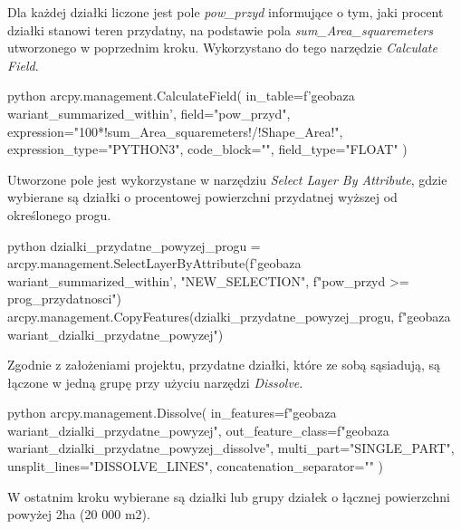 \documentclass{article}
\begin{document}
Dla każdej działki liczone jest pole \textit{pow\_przyd} informujące o tym, jaki procent działki stanowi teren przydatny, na podstawie pola \textit{sum\_Area\_squaremeters} utworzonego w poprzednim kroku. Wykorzystano do tego narzędzie \textit{Calculate Field}.
\vspace{5pt}

\begin{mintedbox}{python}
arcpy.management.CalculateField(
    in_table=f'{geobaza}\\{wariant}_summarized_within',
    field="pow_przyd",
    expression="100*!sum_Area_squaremeters!/!Shape_Area!",
    expression_type="PYTHON3",
    code_block="",
    field_type="FLOAT"
)
\end{mintedbox}
\vspace{10pt}

Utworzone pole jest wykorzystane w narzędziu \textit{Select Layer By Attribute}, gdzie wybierane są działki o procentowej powierzchni przydatnej wyższej od określonego progu.
\vspace{5pt}

\begin{mintedbox}{python}
dzialki_przydatne_powyzej_progu = arcpy.management.SelectLayerByAttribute(f'{geobaza}\\{wariant}_summarized_within', "NEW_SELECTION", f"pow_przyd >= {prog_przydatnosci}")
arcpy.management.CopyFeatures(dzialki_przydatne_powyzej_progu, f"{geobaza}\\{wariant}_dzialki_przydatne_powyzej")
\end{mintedbox}
\vspace{10pt}

Zgodnie z założeniami projektu, przydatne działki, które ze sobą sąsiadują, są łączone w jedną grupę przy użyciu narzędzi \textit{Dissolve}.
\vspace{5pt}

\begin{mintedbox}{python}
arcpy.management.Dissolve(
in_features=f"{geobaza}\\{wariant}_dzialki_przydatne_powyzej",
out_feature_class=f"{geobaza}\\{wariant}_dzialki_przydatne_powyzej_dissolve",
multi_part="SINGLE_PART",
unsplit_lines="DISSOLVE_LINES",
concatenation_separator=""
)
\end{mintedbox}
\vspace{10pt}

W ostatnim kroku wybierane są działki lub grupy działek o łącznej powierzchni powyżej 2ha (20 000 m2).
\end{document}
